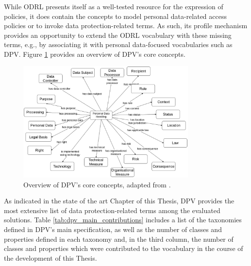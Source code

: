 While ODRL presents itself as a well-tested resource for the expression of policies, it does contain the concepts to model personal data-related access policies or to invoke data protection-related terms.
As such, its profile mechanism provides an opportunity to extend the ODRL vocabulary with these missing terms, e.g., by associating it with personal data-focused vocabularies such as DPV.
Figure \ref{fig:dpv_base} provides an overview of DPV's core concepts.

\begin{figure}[htbp]
\caption{Overview of DPV's core concepts, adapted from \cite{pandit_primer_2022}.}
\label{fig:dpv_base}
\centering
\includegraphics[width=0.8\textwidth]{figures/chapter-4/dpv-base.png}
\end{figure}

As indicated in the state of the art Chapter of this Thesis, DPV provides the most extensive list of data protection-related terms among the evaluated solutions.
Table \ref{tab:dpv_main_contributions} includes a list of the taxonomies defined in DPV's main specification, as well as the number of classes and properties defined in each taxonomy and, in the third column, the number of classes and properties which were contributed to the vocabulary in the course of the development of this Thesis. 

